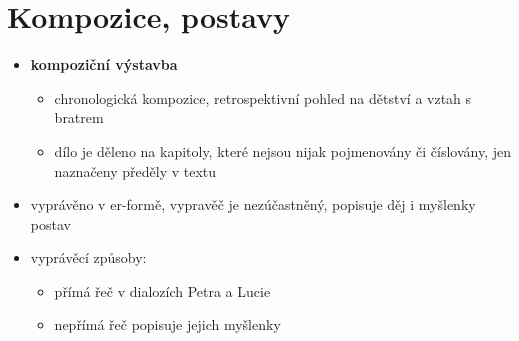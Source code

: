 \documentclass[10pt,a4paper]{article}
\begin{document}
\section*{Kompozice, postavy}
\begin{itemize}
\item \textbf{kompoziční výstavba}
	\begin{itemize}
	\item chronologická kompozice, retrospektivní pohled na dětství a vztah s bratrem
	\item dílo je děleno na kapitoly, které nejsou nijak pojmenovány či číslovány, jen naznačeny předěly v textu
	\end{itemize}
\item vyprávěno v er-formě, vypravěč je nezúčastněný, popisuje děj i myšlenky postav
\item vyprávěcí způsoby:
	\begin{itemize}
	\item přímá řeč v dialozích Petra a Lucie
	\item nepřímá řeč popisuje jejich myšlenky
	\end{itemize}
\end{itemize}
\end{document}
